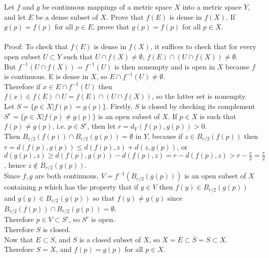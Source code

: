 \documentclass [12pt,letterpaper]{exam}
\begin{document}
\begin{questions}
\question Let $f$ and $g$ be continuous mappings of a metric space
$X$ into a metric space $Y$, and let $E$ be a dense subset of $X$.
Prove that $f(E)$ is dense in $f(X)$. If $g(p)=f(p)$ for all $p \in
E$, prove that $g(p)=f(p)$ for all $p \in X$.\\\\
Proof: To check that $f(E)$ is dense in $f(X)$, it suffices to check that for every open subset $U \subset Y$ such that $U \cap f(X) \neq \emptyset$, $f(E) \cap (U \cap f(X)) \neq \emptyset$. \\
But $f^{-1}(U \cap f(X)) = f^{-1}(U)$ is then nonempty and is open in $X$ because $f$ is continuous. E is dense in $X$, so $E \cap f^{-1}(U) \neq \emptyset$.\\
Therefore if $x \in E \cap f^{-1}(U)$ then $f(x) \in f(E) \cap U = f(E) \cap (U \cap f(X))$, so the latter set is nonempty.\\
Let $S = \big\{ p \in X | f(p) = g(p)\big\}$. Firstly, $S$ is closed by checking its complement $S^c = \big\{p \in X | f(p) \neq g(p)\big\}$ is an open subset of $X$. If $p \in X$ is such that $f(p) \neq g(p)$, i.e. $p \in S^c$, then let $r = d_Y(f(p),g(p)) > 0$.\\
Then $B_{r/2}(f(p)) \cap B_{r/2}(g(p)) = \emptyset$ in $Y$, because if $z \in B_{r/2}(f(p))$ then $r = d(f(p),g(p)) \leq d(f(p),z) + d(z,g(p))$, or $d(g(p),z) \geq d(f(p),g(p)) - d(f(p),z) = r - d(f(p),z) > r-\frac{r}{2} = \frac{r}{2}$, hence $z \notin B_{r/2}(g(p))$.\\
Since $f,g$ are both continuous, $V = f^{-1}(B_{r/2}(g(p)))$ is an open subset of $X$ containing $p$ which has the property that if $y \in V$ then $f(y) \in B_{r/2}(g(p))$ and $g(y) \in B_{r/2}(g(p))$ so that $f(y) \neq g(y)$ since $B_{r/2}(f(p)) \cap B_{r/2}(g(p)) = \emptyset$.\\
Therefore $p \in V \subset S^c$, so $S^c$ is open. \\
Therefore $S$ is closed.\\
Now that $E \subset S$, and $S$ is a closed subset of $X$, so $X = \overline{E} \subset \overline{S} = S \subset X$.\\
Therefore $S = X$, and $f(p) = g(p)$ for all $p \in X$.\\



\end{questions}
\end{document}
